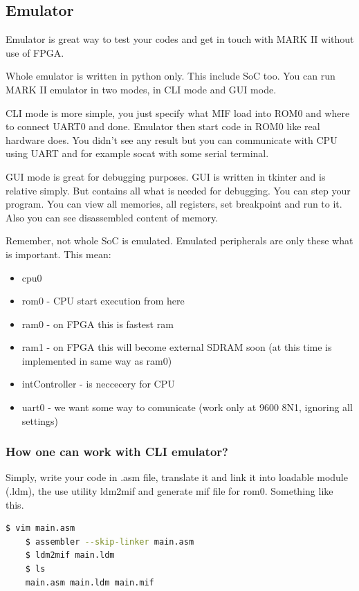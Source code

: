 \subsection{Emulator}

Emulator is great way to test your codes and get in touch with MARK II without
use of FPGA.

Whole emulator is written in python only. This include SoC too. You can run
MARK II emulator in two modes, in CLI mode and GUI mode.

CLI mode is more simple, you just specify what MIF load into ROM0 and where to
connect UART0 and done. Emulator then start code in ROM0 like real hardware
does. You didn't see any result but you can communicate with CPU using UART and
for example socat with some serial terminal.

GUI mode is great for debugging purposes. GUI is written in tkinter and is
relative simply. But contains all what is needed for debugging. You can step
your program. You can view all memories, all registers, set breakpoint and run
to it. Also you can see disassembled content of memory.

Remember, not whole SoC is emulated. Emulated peripherals are only these what
is important. This mean:

\begin{itemize}
   \item cpu0
   \item rom0 - CPU start execution from here
   \item ram0 - on FPGA this is fastest ram
   \item ram1 - on FPGA this will become external SDRAM soon (at this time is implemented in same way as ram0)
   \item intController - is neccecery for CPU
   \item uart0 - we want some way to comunicate (work only at 9600 8N1, ignoring all settings)
\end{itemize}

\subsubsection{How one can work with CLI emulator?}

Simply, write your code in .asm file, translate it and link it into loadable
module (.ldm), the use utility ldm2mif and generate mif file for rom0.
Something like this.

\begin{lstlisting}[language=bash, frame=single]
    $ vim main.asm
    $ assembler --skip-linker main.asm
    $ ldm2mif main.ldm
    $ ls
    main.asm main.ldm main.mif
\end{lstlisting}

